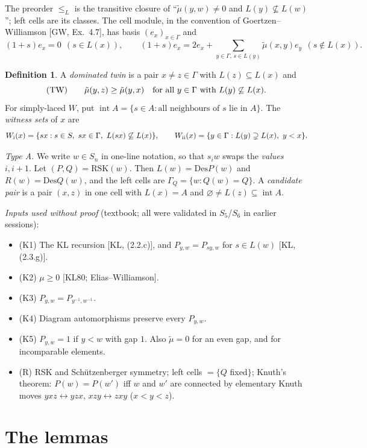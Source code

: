 \documentclass[11pt]{amsart}
\newcommand{\Des}{\mathrm{Des}}
\newcommand{\intr}{\operatorname{int}}
\newcommand{\tmu}{\tilde\mu}
\theoremstyle{plain}
\theoremstyle{definition}
\newtheorem{definition}[theorem]{Definition}
\begin{document}
The preorder $\le_L$ is the transitive closure of ``$\tmu(y,w)\ne0$ and $L(y)\not\subseteq L(w)$''; left cells are its classes. The cell module, in the convention of Goertzen--Williamson [GW, Ex.~4.7], has basis $(e_x)_{x\in\Gamma}$ and
\[
(1+s)e_x=0 \ \ (s\in L(x)),\qquad (1+s)e_x=2e_x+\textstyle\sum_{y\in\Gamma,\,s\in L(y)}\tmu(x,y)e_y\ \ (s\notin L(x)).
\]

\begin{definition}
A \emph{dominated twin} is a pair $x\ne z\in\Gamma$ with $L(z)\subseteq L(x)$ and
\[\textup{(TW)}\qquad \tmu(y,z)\ge\tmu(y,x)\quad\text{for all }y\in\Gamma\text{ with }L(y)\not\subseteq L(x).\]
For simply-laced $W$, put $\intr A=\{s\in A:\text{all neighbours of }s\text{ lie in }A\}$. The \emph{witness sets} of $x$ are
\[
W_{\rm i}(x)=\{sx: s\in S,\ sx\in\Gamma,\ L(sx)\not\subseteq L(x)\},\qquad
W_{\rm ii}(x)=\{y\in\Gamma: L(y)\supsetneq L(x),\ y<x\}.
\]
\end{definition}

\noindent\emph{Type A.} We write $w\in S_n$ in one-line notation, so that $s_iw$ swaps the \emph{values} $i,i+1$. Let $(P,Q)=\mathrm{RSK}(w)$. Then $L(w)=\Des P(w)$ and $R(w)=\Des Q(w)$, and the left cells are $\Gamma_Q=\{w:Q(w)=Q\}$. A \emph{candidate pair} is a pair $(x,z)$ in one cell with $L(x)=A$ and $\varnothing\ne L(z)\subseteq\intr A$.

\smallskip
\noindent\emph{Inputs used without proof} (textbook; all were validated in $S_5$/$S_6$ in earlier sessions):
\begin{itemize}[leftmargin=*,itemsep=0pt]
\item (K1) The KL recursion [KL, (2.2.c)], and $P_{y,w}=P_{sy,w}$ for $s\in L(w)$ [KL, (2.3.g)].
\item (K2) $\mu\ge0$ [KL80; Elias--Williamson].
\item (K3) $P_{y,w}=P_{y^{-1},w^{-1}}$.
\item (K4) Diagram automorphisms preserve every $P_{y,w}$.
\item (K5) $P_{y,w}=1$ if $y<w$ with gap $1$. Also $\tmu=0$ for an even gap, and for incomparable elements.
\item (R) RSK and Schützenberger symmetry; left cells $=\{Q$ fixed$\}$; Knuth's theorem: $P(w)=P(w')$ iff $w$ and $w'$ are connected by elementary Knuth moves $yxz\leftrightarrow yzx$, $xzy\leftrightarrow zxy$ ($x<y<z$).
\end{itemize}

\section{The lemmas}
\end{document}
